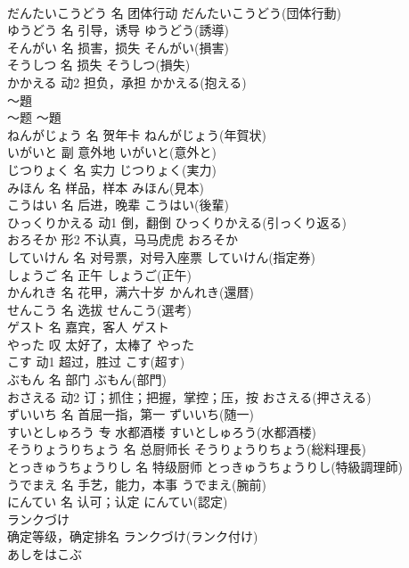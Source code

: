 \documentclass[8pt]{extreport}
\begin{document}
\begin{CJK}{UTF8}{min}
\\	だんたいこうどう	名	团体行动	だんたいこうどう(団体行動)	
\\	ゆうどう	名	引导，诱导	ゆうどう(誘導)	
\\	そんがい	名	损害，损失	そんがい(損害)	
\\	そうしつ	名	损失	そうしつ(損失)	
\\	かかえる	动2	担负，承担	かかえる(抱える)	
\\	～題	
\\	～题	～題	
\\	ねんがじょう	名	贺年卡	ねんがじょう(年賀状)	
\\	いがいと	副	意外地	いがいと(意外と)	
\\	じつりょく	名	实力	じつりょく(実力)	
\\	みほん	名	样品，样本	みほん(見本)	
\\	こうはい	名	后进，晚辈	こうはい(後輩)	
\\	ひっくりかえる	动1	倒，翻倒	ひっくりかえる(引っくり返る)	
\\	おろそか	形2	不认真，马马虎虎	おろそか	
\\	していけん	名	对号票，对号入座票	していけん(指定券)	
\\	しょうご	名	正午	しょうご(正午)	
\\	かんれき	名	花甲，满六十岁	かんれき(還暦)	
\\	せんこう	名	选拔	せんこう(選考)	
\\	ゲスト	名	嘉宾，客人	ゲスト	
\\	やった	叹	太好了，太棒了	やった	
\\	こす	动1	超过，胜过	こす(超す)	
\\	ぶもん	名	部门	ぶもん(部門)	
\\	おさえる	动2	订；抓住；把握，掌控；压，按	おさえる(押さえる)	
\\	ずいいち	名	首屈一指，第一	ずいいち(随一)	
\\	すいとしゅろう	专	水都酒楼	すいとしゅろう(水都酒楼)	
\\	そうりょうりちょう	名	总厨师长	そうりょうりちょう(総料理長)	
\\	とっきゅうちょうりし	名	特级厨师	とっきゅうちょうりし(特級調理師)	
\\	うでまえ	名	手艺，能力，本事	うでまえ(腕前)	
\\	にんてい	名	认可；认定	にんてい(認定)	
\\	ランクづけ	
\\	确定等级，确定排名	ランクづけ(ランク付け)	
\\	あしをはこぶ	

\end{CJK}
\end{document}
